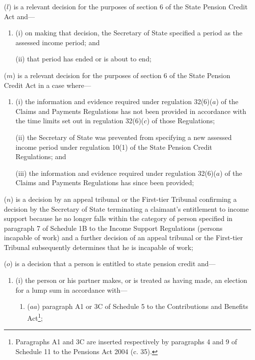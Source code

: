 \documentclass[12pt,a4paper]{article}
\begin{document}
\begin{enumerate}
($l$) is a relevant decision for the purposes of section 6 of the State Pension Credit Act and—
\begin{enumerate}\item[]
(i) on making that decision, the Secretary of State specified a period as the assessed income period; and

(ii) that period has ended or is about to end;
\end{enumerate}

($m$) is a relevant decision for the purposes of section 6 of the State Pension Credit Act in a case where—
\begin{enumerate}\item[]
(i) the information and evidence required under regulation 32(6)($a$)  of the Claims and Payments Regulations has not been provided in accordance with the time limits set out in regulation 32(6)($c$)  of those Regulations;

(ii) the Secretary of State was prevented from specifying a new assessed income period under regulation 10(1) of the State Pension Credit Regulations; and

\begin{sloppypar}
(iii) the information and evidence required under regulation 32(6)($a$)  of the Claims and Payments Regulations has since been provided;
\end{sloppypar}
\end{enumerate}

($n$) is a decision by 
an appeal tribunal or  %
the First-tier Tribunal  %
confirming a decision by the Secretary of State terminating a claimant’s entitlement to income support because he no longer falls within the category of person specified in paragraph 7 of Schedule 1B to the Income Support Regulations (persons incapable of work) and a further 
decision of an appeal tribunal or the First-tier Tribunal  %
subsequently determines that he is incapable of work;

($o$) is a decision that a person is entitled to state pension credit and—
\begin{enumerate}\item[]
(i) the person or his partner makes, or is treated as having made, an election for a lump sum in accordance with—
\begin{enumerate}\item[]
($aa$) paragraph A1 or 3C of Schedule 5 to the Contributions and Benefits Act\footnote{Paragraphs A1 and 3C are inserted respectively by paragraphs 4 and 9 of Schedule 11 to the Pensions Act 2004 (c. 35).};


\end{enumerate}
\end{enumerate}
\end{enumerate}
\end{document}
